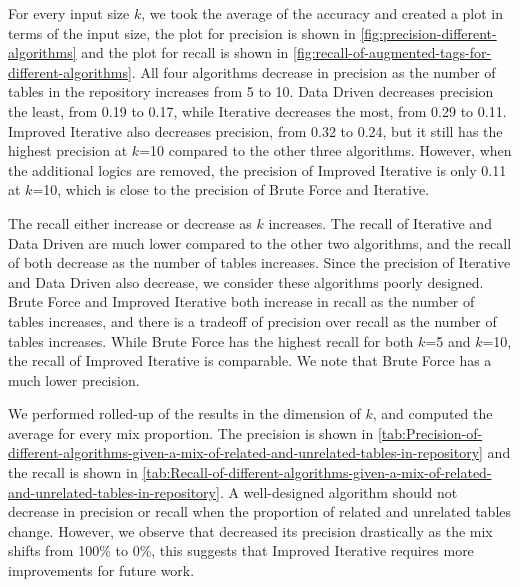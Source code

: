 For every input size $k$, we took the average of the accuracy and created a plot in terms of the input size, the plot for precision is shown in \autoref{fig:precision-different-algorithms} and the plot for recall is shown in \autoref{fig:recall-of-augmented-tags-for-different-algorithms}. All four algorithms decrease in precision as the number of tables in the repository increases from 5 to 10. Data Driven decreases precision the least, from 0.19 to 0.17, while Iterative decreases the most, from 0.29 to 0.11. Improved Iterative also decreases precision, from 0.32 to 0.24, but it still has the highest precision at $k$=10 compared to the other three algorithms. However, when the additional logics are removed, the precision of Improved Iterative is only 0.11 at $k$=10, which is close to the precision of Brute Force and Iterative.

The recall either increase or decrease as $k$ increases. The recall of Iterative and Data Driven are much lower compared to the other two algorithms, and the recall of both decrease as the number of tables increases. Since the precision of Iterative and Data Driven also decrease, we consider these algorithms poorly designed. Brute Force and Improved Iterative both increase in recall as the number of tables increases, and there is a tradeoff of precision over recall as the number of tables increases. While Brute Force has the highest recall for both $k$=5 and $k$=10, the recall of Improved Iterative is comparable. We note that Brute Force has a much lower precision.

We performed rolled-up of the results in the dimension of $k$, and computed the average for every mix proportion. The precision is shown in \autoref{tab:Precision-of-different-algorithms-given-a-mix-of-related-and-unrelated-tables-in-repository} and the recall is shown in \autoref{tab:Recall-of-different-algorithms-given-a-mix-of-related-and-unrelated-tables-in-repository}. A well-designed algorithm should not decrease in precision or recall when the proportion of related and unrelated tables change. However, we observe that decreased its precision drastically as the mix shifts from 100\% to 0\%, this suggests that Improved Iterative requires more improvements for future work.

